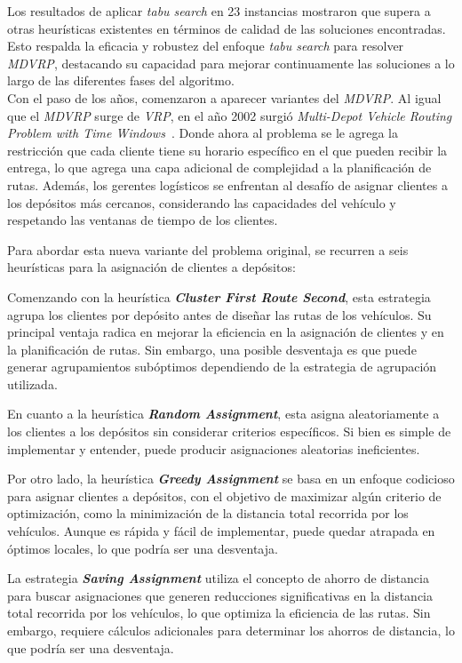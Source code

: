 \documentclass[letter, 10pt]{article}
\begin{document}
Los resultados de aplicar \textit{tabu search} en 23 instancias mostraron que supera a otras heurísticas existentes en términos de calidad de las soluciones encontradas. Esto respalda la eficacia y robustez del enfoque \textit{tabu search} para resolver \textit{MDVRP}, destacando su capacidad para mejorar continuamente las soluciones a lo largo de las diferentes fases del algoritmo.
\\

Con el paso de los años, comenzaron a aparecer variantes del \textit{MDVRP}. Al igual que el \textit{MDVRP} surge de \textit{VRP}, en el año 2002 surgió \textit{Multi-Depot Vehicle Routing Problem with Time Windows}~\cite{MDVRPTW}. Donde ahora al problema se le agrega la restricción que cada cliente tiene su horario específico en el que pueden recibir la entrega, lo que agrega una capa adicional de complejidad a la planificación de rutas. Además, los gerentes logísticos se enfrentan al desafío de asignar clientes a los depósitos más cercanos, considerando las capacidades del vehículo y respetando las ventanas de tiempo de los clientes.

Para abordar esta nueva variante del problema original, se recurren a seis heurísticas para la asignación de clientes a depósitos:

Comenzando con la heurística \textbf{\textit{Cluster First Route Second}}, esta estrategia agrupa los clientes por depósito antes de diseñar las rutas de los vehículos. Su principal ventaja radica en mejorar la eficiencia en la asignación de clientes y en la planificación de rutas. Sin embargo, una posible desventaja es que puede generar agrupamientos subóptimos dependiendo de la estrategia de agrupación utilizada.

En cuanto a la heurística \textbf{\textit{Random Assignment}}, esta asigna aleatoriamente a los clientes a los depósitos sin considerar criterios específicos. Si bien es simple de implementar y entender, puede producir asignaciones aleatorias ineficientes.

Por otro lado, la heurística \textbf{\textit{Greedy Assignment}} se basa en un enfoque codicioso para asignar clientes a depósitos, con el objetivo de maximizar algún criterio de optimización, como la minimización de la distancia total recorrida por los vehículos. Aunque es rápida y fácil de implementar, puede quedar atrapada en óptimos locales, lo que podría ser una desventaja.

La estrategia \textbf{\textit{Saving Assignment}} utiliza el concepto de ahorro de distancia para buscar asignaciones que generen reducciones significativas en la distancia total recorrida por los vehículos, lo que optimiza la eficiencia de las rutas. Sin embargo, requiere cálculos adicionales para determinar los ahorros de distancia, lo que podría ser una desventaja.
\end{document}
